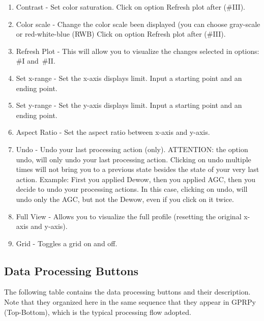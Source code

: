 \documentclass[12pt]{article}
\begin{document}
\begin{enumerate}[label=\Roman*.]

\item Contrast - Set color saturation.  Click on option Refresh plot after (\#III).

\item Color scale - Change the color scale been displayed (you can choose gray-scale or red-white-blue (RWB) Click on option Refresh plot after (\#III).

\item Refresh Plot - This will allow you to visualize the changes selected in options: \#I and~\#II.

\item Set x-range - Set the x-axis displays limit. Input a starting point and an ending point.

\item Set y-range - Set the y-axis displays limit. Input a starting point and an ending point.

\item Aspect Ratio - Set the aspect ratio between x-axis and y-axis.

\item Undo - Undo your last processing action (only). 
ATTENTION: the option undo, will only undo your last processing action. Clicking on undo multiple times will not bring you to a previous state besides the state of your very last action.  
Example: First you applied Dewow, then you applied AGC, then you decide to undo your processing actions. In this case, clicking on undo, will undo only the AGC, but not the Dewow, even if you click on it twice.

\item Full View - Allows you to visualize the full profile (resetting the original x-axis and y-axis).

\item Grid - Toggles a grid on and off.

\end{enumerate}


	\subsection{Data Processing Buttons}
	
The following table contains the data processing buttons and their description. Note that they organized here in the same sequence that they appear in GPRPy (Top-Bottom), which is the typical processing flow adopted. 
\end{document}
